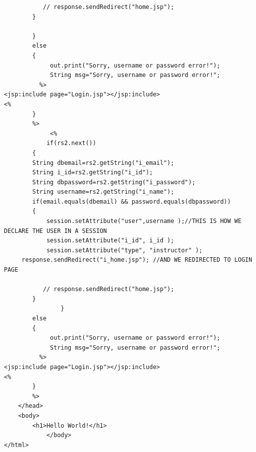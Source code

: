 \begin{lstlisting}
           // response.sendRedirect("home.jsp");
        }
        
        }
        else 
        {
             out.print("Sorry, username or password error!");
             String msg="Sorry, username or password error!";
          %>  
<jsp:include page="Login.jsp"></jsp:include>  
<%  
        } 
        %>
             <% 
            if(rs2.next())
        { 
        String dbemail=rs2.getString("i_email");
        String i_id=rs2.getString("i_id");
        String dbpassword=rs2.getString("i_password");
        String username=rs2.getString("i_name");
        if(email.equals(dbemail) && password.equals(dbpassword))
        {
            session.setAttribute("user",username );//THIS IS HOW WE DECLARE THE USER IN A SESSION
            session.setAttribute("i_id", i_id ); 
            session.setAttribute("type", "instructor" );
	 response.sendRedirect("i_home.jsp"); //AND WE REDIRECTED TO LOGIN PAGE
			
           // response.sendRedirect("home.jsp");
        }
                }
        else 
        {
             out.print("Sorry, username or password error!");
             String msg="Sorry, username or password error!";
          %>  
<jsp:include page="Login.jsp"></jsp:include>  
<%  
        } 
        %>
    </head>
    <body>
        <h1>Hello World!</h1>
            </body>
</html>

\end{lstlisting}

